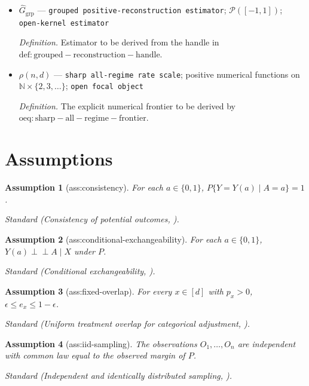 \documentclass{article}
\newtheorem{assumption}{Assumption}
\begin{document}
\begin{itemize}
  \item \(\widehat G_{\mathrm{grp}}\) --- \texttt{grouped positive-\allowbreak{}reconstruction estimator}; \(\mathcal P([-1,1])\); \texttt{open-\allowbreak{}kernel estimator}
  \par\smallskip\noindent\emph{Definition.} Estimator to be derived from the handle in \(\mathrm{def:grouped-reconstruction-handle}\).
  \item \(\rho(n,d)\) --- \texttt{sharp all-\allowbreak{}regime rate scale}; positive numerical functions on \(\mathbb N\times\{2,3,\ldots\}\); \texttt{open focal object}
  \par\smallskip\noindent\emph{Definition.} The explicit numerical frontier to be derived by \(\mathrm{oeq:sharp-all-regime-frontier}\).
\end{itemize}

\section{Assumptions}

\begin{assumption}[ass:consistency]\label{ass:consistency}
For each \(a\in\{0,1\}\), \(P\{Y=Y(a)\mid A=a\}=1\).
\par\smallskip\noindent\emph{Standard} (Consistency of potential outcomes, \cite{HernanRobins2020}).
\end{assumption}

\begin{assumption}[ass:conditional-exchangeability]\label{ass:conditional-exchangeability}
For each \(a\in\{0,1\}\), \(Y(a)\mathrel{\perp\!\!\!\perp}A\mid X\) under \(P\).
\par\smallskip\noindent\emph{Standard} (Conditional exchangeability, \cite{HernanRobins2020}).
\end{assumption}

\begin{assumption}[ass:fixed-overlap]\label{ass:fixed-overlap}
For every \(x\in[d]\) with \(p_x>0\), \(\epsilon\le e_x\le1-\epsilon\).
\par\smallskip\noindent\emph{Standard} (Uniform treatment overlap for categorical adjustment, \cite{ZengBalakrishnanHanKennedy2024}).
\end{assumption}

\begin{assumption}[ass:iid-sampling]\label{ass:iid-sampling}
The observations \(O_1,\ldots,O_n\) are independent with common law equal to the observed margin of \(P\).
\par\smallskip\noindent\emph{Standard} (Independent and identically distributed sampling, \cite{vanDerVaart1998}).
\end{assumption}
\end{document}
